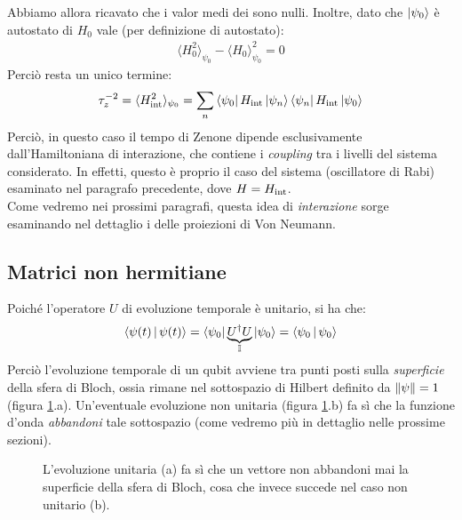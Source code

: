 \documentclass[../../InformazioneQuantistica.tex]{subfiles}
\begin{document}
Abbiamo allora ricavato che i valor medi dei  sono nulli. Inoltre, dato che $\Ket{\psi_0}$ è autostato di $H_0$ vale (per definizione di autostato):
\begin{align*}
\langle H_0^2 \rangle_{\psi_0} - \langle H_0 \rangle^2_{\psi_0} =0
\end{align*}  
Perciò resta un unico termine:
\begin{align*}
\tau_z^{-2} = \langle H_{\operatorname{int}}^2 \rangle_{\psi_0} = \sum_n \Bra{\psi_0}H_{\operatorname{int}}\Ket{\psi_n}\Bra{\psi_n}H_{\operatorname{int}}\Ket{\psi_0}
\end{align*}
Perciò, in questo caso il tempo di Zenone dipende esclusivamente dall'Hamiltoniana di interazione, che contiene i \textit{coupling} tra i livelli del sistema considerato. In effetti, questo è proprio il caso del sistema (oscillatore di Rabi) esaminato nel paragrafo precedente, dove $H= H_{\operatorname{int}}$.\\

Come vedremo nei prossimi paragrafi, questa idea di \textit{interazione} sorge esaminando nel dettaglio i  delle proiezioni di Von Neumann.

\subsection{Matrici  non hermitiane}

Poiché l'operatore $U$ di evoluzione temporale è unitario, si ha che:
\begin{align*}
\Braket{\psi(t)|\psi(t)} = \Bra{\psi_0}\underbrace{U^\dag U}_{\mathbb{I}}\Ket{\psi_0} = \Braket{\psi_0|\psi_0}
\end{align*} 
Perciò l'evoluzione temporale di un qubit avviene tra punti posti sulla \textit{superficie} della sfera di Bloch, ossia rimane nel sottospazio di Hilbert definito da $\left\lVert\psi\right\rVert=1$ (figura \ref{fig:sfera-bloch-evoluzione}.a). Un'eventuale evoluzione non unitaria (figura \ref{fig:sfera-bloch-evoluzione}.b) fa sì che la funzione d'onda \textit{abbandoni} tale sottospazio (come vedremo più in dettaglio nelle prossime sezioni).

\begin{figure}[H]
\centering

\caption{L'evoluzione unitaria (a) fa sì che un vettore non abbandoni mai la superficie della sfera di Bloch, cosa che invece succede nel caso non unitario (b).\label{fig:sfera-bloch-evoluzione}}
\end{figure}
\end{document}
